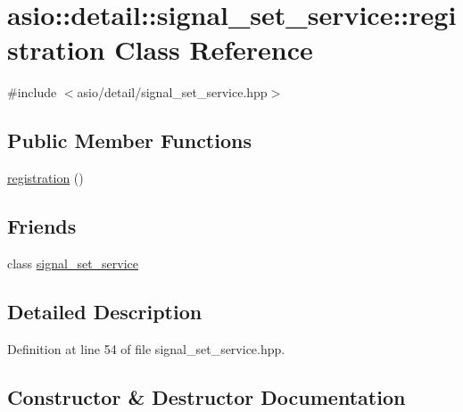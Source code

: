 \hypertarget{classasio_1_1detail_1_1signal__set__service_1_1registration}{}\section{asio\+:\+:detail\+:\+:signal\+\_\+set\+\_\+service\+:\+:registration Class Reference}
\label{classasio_1_1detail_1_1signal__set__service_1_1registration}


{\ttfamily \#include $<$asio/detail/signal\+\_\+set\+\_\+service.\+hpp$>$}

\subsection*{Public Member Functions}
\begin{DoxyCompactItemize}
\item 
\hyperlink{classasio_1_1detail_1_1signal__set__service_1_1registration_a65c2ce3d5492faca9aa77186b245768a}{registration} ()
\end{DoxyCompactItemize}
\subsection*{Friends}
\begin{DoxyCompactItemize}
\item 
class \hyperlink{classasio_1_1detail_1_1signal__set__service_1_1registration_a4c3a636c56d1c7da28cabb117a52300b}{signal\+\_\+set\+\_\+service}
\end{DoxyCompactItemize}


\subsection{Detailed Description}


Definition at line 54 of file signal\+\_\+set\+\_\+service.\+hpp.



\subsection{Constructor \& Destructor Documentation}
\hypertarget{classasio_1_1detail_1_1signal__set__service_1_1registration_a65c2ce3d5492faca9aa77186b245768a}{}
